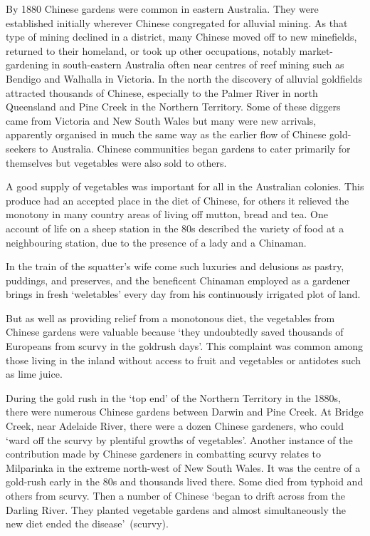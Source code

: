 By 1880 Chinese gardens were common in eastern Australia.  They were
established initially wherever Chinese congregated for alluvial
mining.  As that type of mining declined in a
district, many Chinese moved off to new minefields, returned to their
homeland, or took up other occupations, notably market-gardening in
south-eastern Australia often near centres of reef mining
 such as Bendigo  and Walhalla
 in Victoria.  In the north the discovery of alluvial
goldfields attracted thousands of Chinese, especially to the Palmer
River in
 north
Queensland  and Pine Creek  in the
Northern Territory.   Some of these diggers
came from Victoria and New South Wales but many were new arrivals,
apparently organised in much the same way as the earlier flow of
Chinese gold-seekers to Australia.  Chinese communities began gardens
to cater primarily for themselves but vegetables were also sold to
others.

A good supply of vegetables was important for all in the Australian
colonies.  This produce had an accepted place in the diet of Chinese,
for others it relieved the monotony in many country areas of living
off mutton, bread and tea.  One account of life on a sheep station in
the 80s described the variety of food at a neighbouring station, due
to the presence of a lady and a Chinaman.
\begin{Quote}
	In the train of the squatter's wife come such luxuries and
	delusions as pastry, puddings, and preserves, and the
	beneficent Chinaman employed as a gardener brings in fresh
	`weletables' every day from his continuously irrigated plot of
	land.
\end{Quote}
But as well as providing relief from a monotonous diet, the vegetables
from Chinese gardens were valuable because `they undoubtedly saved
thousands of Europeans from scurvy in the goldrush
days'.  This complaint was common among those living in
the inland without access to fruit and vegetables or antidotes such as
lime juice.

During the gold rush in the `top end' of the Northern Territory
 in the
1880s, there were numerous Chinese  gardens between Darwin
 and Pine Creek.  At Bridge Creek,
near Adelaide River,  there were a dozen Chinese
gardeners, who could `ward off the scurvy by plentiful growths of
vegetables'.  Another instance of the contribution made by Chinese
gardeners in combatting scurvy relates to Milparinka
 in the extreme north-west of New South Wales.  It
was the centre of a gold-rush early in the 80s and thousands lived
there.  Some died from typhoid and others from scurvy.  Then a number
of Chinese `began to drift across from the Darling River. They planted
vegetable gardens and almost simultaneously the new diet ended the
disease'~(scurvy).

